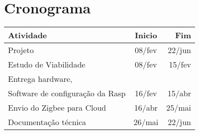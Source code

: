 \documentclass{acm_proc_article-sp}
\begin{document}
\section{Cronograma}


\begin{table}[h!]
\centering
\begin{tabular}{l|c|r}
Atividade & Inicio & Fim \\
\hline
Projeto & 08/fev & 22/jun \\
\hline
Estudo de Viabilidade & 08/fev & 15/fev \\
Entrega hardware, & & \\
Software de configuração da Rasp & 16/fev & 15/abr \\
Envio do Zigbee para Cloud & 16/abr & 25/mai \\
Documentação técnica & 26/mai & 22/jun \\
\end{tabular}
\label{tab:my_label}
\end{table}
\end{document}
